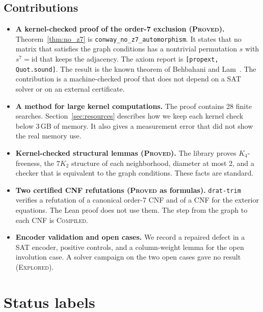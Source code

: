 \documentclass{article}
\theoremstyle{plain}
\theoremstyle{definition}
\numberwithin{equation}{section}
\begin{document}
\subsection{Contributions}

\begin{itemize}
 \item \textbf{A kernel-checked proof of the order-7 exclusion (\textsc{Proved}).} Theorem~\ref{thm:no_z7} is \texttt{conway\_no\_z7\_automorphism}. It states that no matrix that satisfies the graph conditions has a nontrivial permutation $s$ with $s^7 = \mathrm{id}$ that keeps the adjacency. The axiom report is \texttt{[propext, Quot.sound]}. The result is the known theorem of Behbahani and Lam~\cite{behbahani2011strongly}. The contribution is a machine-checked proof that does not depend on a SAT solver or on an external certificate.
 \item \textbf{A method for large kernel computations.} The proof contains 28 finite searches. Section~\ref{sec:resources} describes how we keep each kernel check below 3\,GB of memory. It also gives a measurement error that did not show the real memory use.
 \item \textbf{Kernel-checked structural lemmas (\textsc{Proved}).} The library proves $K_4$-freeness, the $7K_2$ structure of each neighborhood, diameter at most 2, and a checker that is equivalent to the graph conditions. These facts are standard.
 \item \textbf{Two certified CNF refutations (\textsc{Proved} as formulas).} \texttt{drat-trim} verifies a refutation of a canonical order-7 CNF and of a CNF for the exterior equations. The Lean proof does not use them. The step from the graph to each CNF is \textsc{Compiled}.
 \item \textbf{Encoder validation and open cases.} We record a repaired defect in a SAT encoder, positive controls, and a column-weight lemma for the open involution case. A solver campaign on the two open cases gave no result (\textsc{Explored}).
\end{itemize}

\section{Status labels}
\label{sec:taxonomy}
\end{document}
